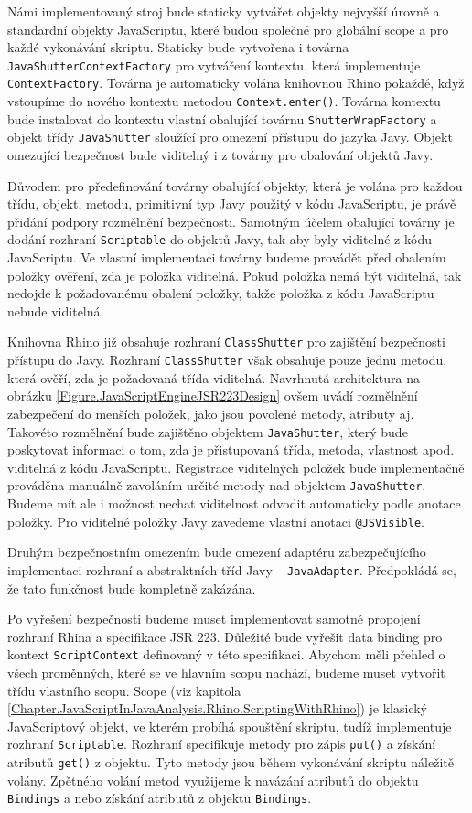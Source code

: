 Námi implementovaný stroj bude staticky vytvářet objekty nejvyšší úrovně a standardní objekty JavaScriptu, které budou společné pro globální scope a pro každé vykonávání skriptu. Staticky bude vytvořena i továrna \texttt{JavaShutterContextFactory} pro vytváření kontextu, která implementuje \texttt{ContextFactory}. Továrna je automaticky volána knihovnou Rhino pokaždé, když vstoupíme do nového kontextu metodou \texttt{Context.enter()}. Továrna kontextu bude instalovat do kontextu vlastní obalující továrnu \texttt{ShutterWrapFactory} a objekt třídy \texttt{JavaShutter} sloužící pro omezení přístupu do jazyka Javy. Objekt omezující bezpečnost bude viditelný i z továrny pro obalování objektů Javy.

Důvodem pro předefinování továrny obalující objekty, která je volána pro každou třídu, objekt, metodu, primitivní typ Javy použitý v kódu JavaScriptu, je právě přidání podpory rozmělnění bezpečnosti. Samotným účelem obalující továrny je dodání rozhraní \texttt{Scriptable} do objektů Javy, tak aby byly viditelné z kódu JavaScriptu. Ve vlastní implementaci továrny budeme provádět před obalením položky ověření, zda je položka viditelná. Pokud položka nemá být viditelná, tak nedojde k požadovanému obalení položky, takže položka z kódu JavaScriptu nebude viditelná.

Knihovna Rhino již obsahuje rozhraní \texttt{ClassShutter} pro zajištění bezpečnosti přístupu do Javy. Rozhraní \texttt{ClassShutter} však obsahuje pouze jednu metodu, která ověří, zda je požadovaná třída viditelná. Navrhnutá architektura na obrázku \ref{Figure.JavaScriptEngineJSR223Design} ovšem uvádí rozmělnění zabezpečení do menších položek, jako jsou povolené metody, atributy aj. Takovéto rozmělnění bude zajištěno objektem \texttt{JavaShutter}, který bude poskytovat informaci o tom, zda je přistupovaná třída, metoda, vlastnost apod. viditelná z kódu JavaScriptu. Registrace viditelných položek bude implementačně prováděna manuálně zavoláním určité metody nad objektem \texttt{JavaShutter}. Budeme mít ale i možnost nechat viditelnost odvodit automaticky podle anotace položky. Pro viditelné položky Javy zavedeme vlastní anotaci \texttt{@JSVisible}. 

Druhým bezpečnostním omezením bude omezení adaptéru zabezpečujícího implementaci rozhraní a abstraktních tříd Javy -- \texttt{JavaAdapter}. Předpokládá se, že tato funkčnost bude kompletně zakázána.

Po vyřešení bezpečnosti budeme muset implementovat samotné propojení rozhraní Rhina a specifikace JSR 223. Důležité bude vyřešit data binding pro kontext \texttt{ScriptContext} definovaný v této specifikaci. Abychom měli přehled o všech proměnných, které se ve hlavním scopu nachází, budeme muset vytvořit třídu vlastního scopu. Scope (viz kapitola \ref{Chapter.JavaScriptInJavaAnalysis.Rhino.ScriptingWithRhino}) je klasický JavaScriptový objekt, ve kterém probíhá spouštění skriptu, tudíž implementuje rozhraní \texttt{Scriptable}. Rozhraní specifikuje metody pro zápis \texttt{put()} a získání atributů \texttt{get()} z objektu. Tyto metody jsou během vykonávání skriptu náležitě volány. Zpětného volání metod využijeme k navázání atributů do objektu \texttt{Bindings} a nebo získání atributů z objektu \texttt{Bindings}. 


